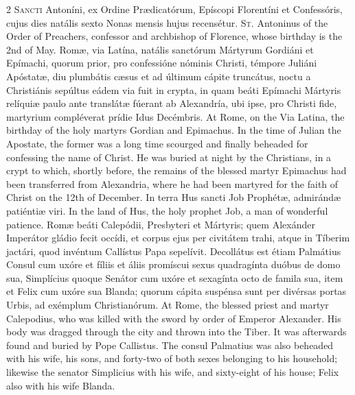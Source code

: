 \begin{paracol}{2}
\lettrine[lines=2]{S}{ancti} Antoníni, ex 
 Ordine Prædicatórum, Epíscopi Florentíni et Confessóris, cujus dies natális 
 sexto Nonas mensis hujus recensétur.
\switchcolumn
{}
\lettrine[lines=2]{S}{t.} Antoninus of the Order of 
 Preachers, confessor and archbishop of Florence, whose birthday is the 2nd 
 of May.
\switchcolumn*
{}
Romæ, via Latína, natális sanctórum Mártyrum Gordiáni et Epímachi, quorum prior, pro 
 confessióne nóminis Christi, témpore Juliáni Apóstatæ, diu plumbátis cæsus 
 et ad últimum cápite truncátus, noctu a Christiánis sepúltus eádem via fuit 
 in crypta, in quam beáti Epímachi Mártyris relíquiæ paulo ante translátæ 
 fúerant ab Alexandría, ubi ipse, pro Christi fide, martyrium compléverat 
 prídie Idus Decémbris.
\switchcolumn
{}
At Rome, on the Via Latina, the 
 birthday of the holy martyrs Gordian and Epimachus. In the time of 
 Julian the Apostate, the former was a long time scourged and finally 
 beheaded for confessing the name of Christ. He was buried at night by 
 the Christians, in a crypt to which, shortly before, the remains of the 
 blessed martyr Epimachus had been transferred from Alexandria, where he had 
 been martyred for the faith of Christ on the 12th of December.
\switchcolumn*
{}
In terra Hus sancti 
 Job Prophétæ, admirándæ patiéntiæ viri.
\switchcolumn
{}
In the land of Hus, the holy 
 prophet Job, a man of wonderful patience.
\switchcolumn*
{}
Romæ beáti Calepódii, 
 Presbyteri et Mártyris; quem Alexánder Imperátor gládio fecit occídi, et 
 corpus ejus per civitátem trahi, atque in Tíberim jactári, quod invéntum 
 Callístus Papa sepelívit. Decollátus est étiam Palmátius Consul cum 
 uxóre et fíliis et áliis promíscui sexus quadragínta duóbus de domo sua, 
 Simplícius quoque Senátor cum uxóre et sexagínta octo de famila sua, item et 
 Felix cum uxóre sua Blanda; quorum cápita suspénsa sunt per divérsas portas 
 Urbis, ad exémplum Christianórum.
\switchcolumn
{}
At Rome, the blessed priest and 
 martyr Calepodius, who was killed with the sword by order of Emperor 
 Alexander. His body was dragged through the city and thrown into the 
 Tiber. It was afterwards found and buried by Pope Callistus. The 
 consul Palmatius was also beheaded with his wife, his sons, and forty-two of 
 both sexes belonging to his household; likewise the senator Simplicius with 
 his wife, and sixty-eight of his house; Felix also with his wife Blanda. 

\end{paracol}

